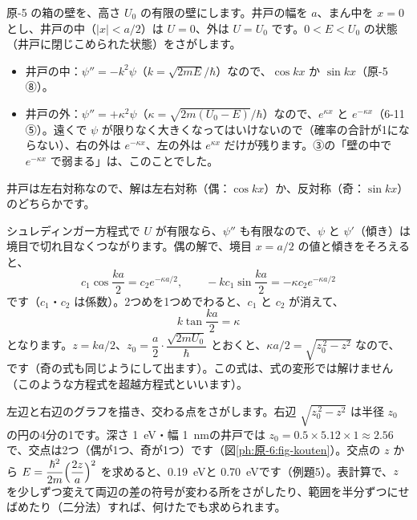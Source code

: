 \phkokomade


\label{ph:原-6:sec6}
原-5 の箱の壁を、高さ $U_0$ の有限の壁にします。井戸の幅を $a$、まん中を $x=0$ とし、井戸の中（$|x|<a/2$）は $U=0$、外は $U=U_0$ です。$0<E<U_0$ の状態（井戸に閉じこめられた状態）をさがします。

\begin{itemize}[leftmargin=1.2\zw, itemsep=2pt, topsep=2pt, label={\color{bkTheme}●}]
\item 井戸の中：$\psi''=-k^2\psi$（$k=\sqrt{2mE}/\hbar$）なので、$\cos kx$ か $\sin kx$（原-5 ⑧）。
\item 井戸の外：$\psi''=+\kappa^2\psi$（$\kappa=\sqrt{2m(U_0-E)}/\hbar$）なので、$e^{\kappa x}$ と $e^{-\kappa x}$（6-11 ⑤）。遠くで $\psi$ が限りなく大きくなってはいけないので（確率の合計が1にならない）、右の外は $e^{-\kappa x}$、左の外は $e^{\kappa x}$ だけが残ります。③の「壁の中で $e^{-\kappa x}$ で弱まる」は、このことでした。
\end{itemize}
井戸は左右対称なので、解は左右対称（偶：$\cos kx$）か、反対称（奇：$\sin kx$）のどちらかです。

シュレディンガー方程式で $U$ が有限なら、$\psi''$ も有限なので、$\psi$ と $\psi'$（傾き）は境目で切れ目なくつながります。偶の解で、境目 $x=a/2$ の値と傾きをそろえると、
\[c_1\cos\frac{ka}{2}=c_2e^{-\kappa a/2},\qquad -kc_1\sin\frac{ka}{2}=-\kappa c_2e^{-\kappa a/2}\]
です（$c_1$・$c_2$ は係数）。2つめを1つめでわると、$c_1$ と $c_2$ が消えて、
\[k\tan\frac{ka}{2}=\kappa\]
となります。$z=ka/2$、$z_0=\dfrac a2\cdot\dfrac{\sqrt{2mU_0}}{\hbar}$ とおくと、$\kappa a/2=\sqrt{z_0^{\,2}-z^2}$ なので、
\label{ph:原-6:yugen}です（奇の式も同じようにして出ます）。この式は、式の変形では解けません（このような方程式を超越方程式といいます）。

左辺と右辺のグラフを描き、交わる点をさがします。右辺 $\sqrt{z_0^{\,2}-z^2}$ は半径 $z_0$ の円の4分の1です。深さ \qty{1}{eV}・幅 \qty{1}{nm}の井戸では $z_0=0.5\times5.12\times1\approx2.56$ で、交点は2つ（偶が1つ、奇が1つ）です（図\ref{ph:原-6:fig-kouten}）。交点の $z$ から $E=\dfrac{\hbar^2}{2m}\Bigl(\dfrac{2z}{a}\Bigr)^2$ を求めると、\qty{0.19}{eV}と \qty{0.70}{eV}です（例題5）。表計算で、$z$ を少しずつ変えて両辺の差の符号が変わる所をさがしたり、範囲を半分ずつにせばめたり（二分法）すれば、何けたでも求められます。

